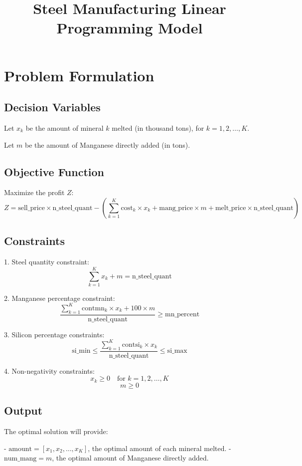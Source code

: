 \documentclass{article}
\begin{document}
\title{Steel Manufacturing Linear Programming Model}
\author{}
\date{}
\maketitle

\section*{Problem Formulation}

\subsection*{Decision Variables}
Let \( x_k \) be the amount of mineral \( k \) melted (in thousand tons), for \( k = 1, 2, \ldots, K \).

Let \( m \) be the amount of Manganese directly added (in tons).

\subsection*{Objective Function}
Maximize the profit \( Z \):
\[
Z = \text{sell\_price} \times \text{n\_steel\_quant} - \left( \sum_{k=1}^{K} \text{cost}_k \times x_k + \text{mang\_price} \times m + \text{melt\_price} \times \text{n\_steel\_quant} \right)
\]

\subsection*{Constraints}

1. Steel quantity constraint:
\[
\sum_{k=1}^{K} x_k + m = \text{n\_steel\_quant}
\]

2. Manganese percentage constraint:
\[
\frac{\sum_{k=1}^{K} \text{contmn}_{k} \times x_k + 100 \times m}{\text{n\_steel\_quant}} \geq \text{mn\_percent}
\]

3. Silicon percentage constraints:
\[
\text{si\_min} \leq \frac{\sum_{k=1}^{K} \text{contsi}_{k} \times x_k}{\text{n\_steel\_quant}} \leq \text{si\_max}
\]

4. Non-negativity constraints:
\[
x_k \geq 0 \quad \text{for } k = 1, 2, \ldots, K
\]
\[
m \geq 0
\]

\subsection*{Output}
The optimal solution will provide:

- \( \text{amount} = [x_1, x_2, \ldots, x_K] \), the optimal amount of each mineral melted.
- \( \text{num\_mang} = m \), the optimal amount of Manganese directly added.
\end{document}
